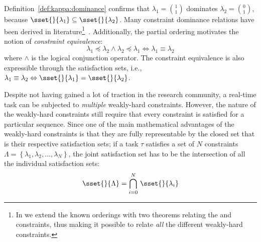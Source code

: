 %
Definition~\ref{def:kappa:dominance} confirms that $\lambda_1 = \binom{1}{1}$ dominates $\lambda_2 = \binom{0}{1}$, because $\sset{}{\lambda_1} \subseteq \sset{}{\lambda_2}$.
Many constraint dominance relations have been derived in literature\footnote{In  we extend the known orderings with two theorems relating the \tAH{} and \tRH{} constraints, thus making it possible to relate \emph{all} the different weakly-hard constraints.}~\cite{Bernat:2001}.
Additionally, the partial ordering motivates the notion of \emph{constraint equivalence}:
%
\begin{equation*}
    \lambda_1 \preceq \lambda_2 \land \lambda_2 \preceq \lambda_1 \Leftrightarrow \lambda_1 \equiv \lambda_2
\end{equation*}
%
where $\land$ is the logical conjunction operator.
The constraint equivalence is also expressible through the satisfaction sets, i.e., $\lambda_1 \equiv \lambda_2 \Leftrightarrow \sset{}{\lambda_1} = \sset{}{\lambda_2}$.

Despite not having gained a lot of traction in the research community, a real-time task can be subjected to \emph{multiple} weakly-hard constraints.
However, the nature of the weakly-hard constraints still require that every constraint is satisfied for a particular sequence.
Since one of the main mathematical advantages of the weakly-hard constraints is that they are fully representable by the closed set that is their respective satisfaction sets; if a task $\tau$ satisfies a set of $N$ constraints $\Lambda = \left\{ \lambda_1, \lambda_2, \ldots, \lambda_N \right\}$, the joint satisfaction set has to be the intersection of all the individual satisfaction sets:
%
\begin{equation*}
    \sset{}{\Lambda} = \bigcap_{i=0}^N \, \sset{}{\lambda_i}
\end{equation*}

\begin{figure}[t]
    \centering
    
    \caption{}
    \label{fig:schedule}
\end{figure}

